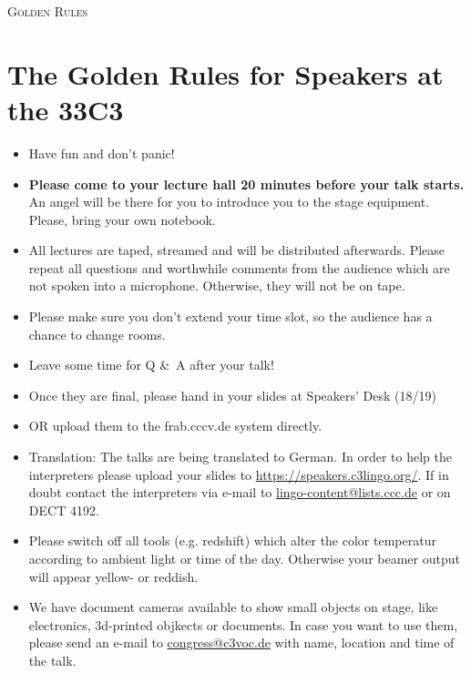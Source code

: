 \documentclass[paper=a4]{scrartcl}
\begin{document}
	\begin{center} \textsc{\Huge Golden Rules}\end{center}
	\hfill
	\section*{The Golden Rules for Speakers at the 33C3}
	\begin{itemize}
		\item Have fun and don't panic!
		\item \textbf{Please come to your lecture hall 20 minutes before your talk starts.} An
		angel will be there	for	you	to introduce you to	the stage equipment. Please, bring your own notebook.
		\item All lectures are taped, streamed and will be distributed afterwards. Please repeat all questions and worthwhile comments from the audience which are not spoken into a microphone. Otherwise, they will not be on tape.
		\item Please make sure you don't extend your time slot, so the audience has a chance to change rooms.
		\item Leave some time for Q \&\ A after your talk!
		\item Once they are final, please hand in your slides at Speakers' Desk (18/19) 
		\item[] OR upload them to the frab.cccv.de system directly.
		\item Translation: The talks are being translated to German. In order to help the interpreters please upload your slides to \url{https://speakers.c3lingo.org/}. If in doubt contact the interpreters via e-mail  to \url{lingo-content@lists.ccc.de} or on DECT 4192.
		\item Please switch off all tools (e.g. redshift) which alter the color temperatur according to ambient light or time of the day. Otherwise your beamer output will appear yellow- or reddish.
		\item We have document cameras available to show small objects on stage, like electronics, 3d-printed objkects or documents. In case you want to use them, please send an e-mail to \url{congress@c3voc.de} with name, location and time of the talk.
	\end{itemize}
\end{document}
